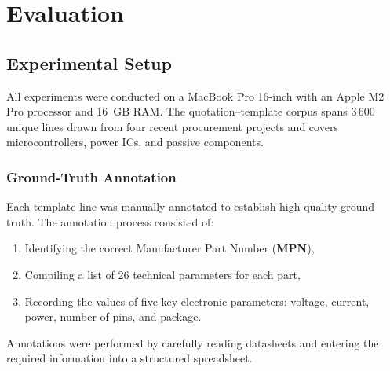 \chapter{Evaluation}
\label{chapter:evaluation}

\section{Experimental Setup}
All experiments were conducted on a MacBook Pro 16-inch with an Apple M2 Pro processor and 16~GB RAM. The quotation–template corpus spans 3\,600 unique lines drawn from four recent procurement projects and covers microcontrollers, power ICs, and passive components.

\subsection{Ground-Truth Annotation}
Each template line was manually annotated to establish high-quality ground truth. The annotation process consisted of:
\begin{enumerate}
  \item Identifying the correct Manufacturer Part Number (\textbf{MPN}),
  \item Compiling a list of 26 technical parameters for each part,
  \item Recording the values of five key electronic parameters: voltage, current, power, number of pins, and package.
\end{enumerate}
Annotations were performed by carefully reading datasheets and entering the required information into a structured spreadsheet.

